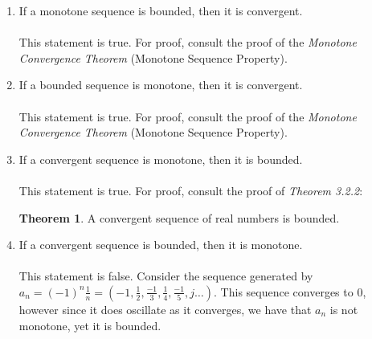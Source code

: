 \documentclass[12pt,letterpaper]{article}
\theoremstyle{case}
\theoremstyle{definition}
\newtheorem*{theorem*}{Theorem}
\begin{document}
\begin{enumerate}
\begin{enumerate}
		\item If a monotone sequence is bounded, then it is convergent.
		\\\\This statement is true. For proof, consult the proof of the \textit{Monotone Convergence Theorem} (Monotone Sequence Property).
		
		\item If a bounded sequence is monotone, then it is convergent.
		\\\\This statement is true. For proof, consult the proof of the \textit{Monotone Convergence Theorem} (Monotone Sequence Property).
		
		\item If a convergent sequence is monotone, then it is bounded.
		\\\\This statement is true. For proof, consult the proof of \textit{Theorem 3.2.2}:
		\begin{theorem*}
			A convergent sequence of real numbers is bounded.
		\end{theorem*}
		
		\item If a convergent sequence is bounded, then it is monotone.
		\\\\This statement is false. Consider the sequence generated by $a_n=(-1)^n\frac{1}{n}=(-1,\frac{1}{2},\frac{-1}{3},\frac{1}{4},\frac{-1}{5}, j\dots)$. This sequence converges to 0, however since it does oscillate as it converges, we have that $a_n$ is not monotone, yet it is bounded.
	\end{enumerate}
	\end{enumerate}
\end{document}
